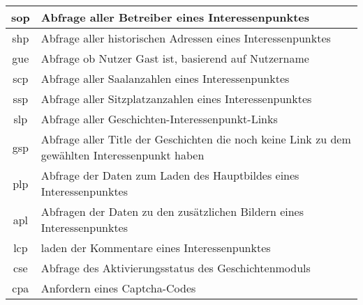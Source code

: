 \begin{longtable}[H]{|c|p{12cm}|}
		sop                 & Abfrage aller Betreiber eines Interessenpunktes                                                                                                    \\ \hline
		shp                 & Abfrage aller historischen Adressen eines Interessenpunktes                                                                                        \\ \hline
		gue                 & Abfrage ob Nutzer Gast ist, basierend auf Nutzername                                                                                               \\ \hline
		scp                 & Abfrage aller Saalanzahlen eines Interessenpunktes                                                                                                 \\ \hline
		ssp                 & Abfrage aller Sitzplatzanzahlen eines Interessenpunktes                                                                                            \\ \hline
		slp                 & Abfrage aller Geschichten-Interessenpunkt-Links                                                                                                    \\ \hline
		gsp                 & Abfrage aller Title der Geschichten die noch keine Link zu dem gewählten Interessenpunkt haben                                                     \\ \hline
		plp                 & Abfrage der Daten zum Laden des Hauptbildes eines Interessenpunktes                                                                                \\ \hline
		apl                 & Abfragen der Daten zu den zusätzlichen Bildern eines Interessenpunktes                                                                             \\ \hline
		lcp                 & laden der Kommentare eines Interessenpunktes                                                                                                       \\ \hline
		cse                 & Abfrage des Aktivierungsstatus des Geschichtenmoduls                                                                                               \\ \hline
		cpa                 & Anfordern eines Captcha-Codes                                                                                                                      \\ \hline

\end{longtable}
